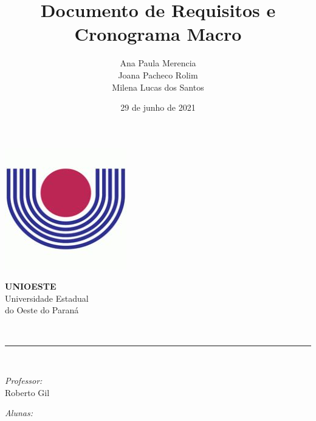 \documentclass[12pt, a4paper]{article}
\author{Ana Paula Merencia \\ Joana Pacheco Rolim \\ Milena Lucas dos Santos}
\title{Documento de Requisitos e Cronograma Macro}
\date{29 de junho de 2021}
\newcommand{\prof}{Roberto Gil}
\begin{document}
\begin{titlepage}
  \centering
  \thispagestyle{fancy}

  \begin{minipage}{0.4\textwidth}
    \begin{flushleft}
      \includegraphics[scale=0.6]{logoUnioeste.jpeg}\\[1.0 cm]
    \end{flushleft}
  \end{minipage}
  \begin{minipage}{0.5\textwidth}
    \begin{flushright}\large
      \textsc{\LARGE\textbf{UNIOESTE}}\\
      \vspace{1cm}
      Universidade Estadual\\do Oeste do Paraná
    \end{flushright}
  \end{minipage}
  \vspace*{4.5 cm}

  {\huge\bfseries\thetitle}\\
  \rule{\linewidth}{0.2 mm}\\[1.5 cm]
  
  \vspace{2cm}
  \begin{minipage}[t]{0.4\textwidth}
    \begin{flushleft}\large
      \emph{Professor:}\\
      \prof
    \end{flushleft}
  \end{minipage}
  \begin{minipage}[t]{0.5\textwidth}

    \begin{flushright}\large
      \emph{Alunas:}\\
      \theauthor
    \end{flushright}

  \end{minipage}\\[2 cm]
  
  \vfill\thedate
  \end{titlepage}
\end{document}
